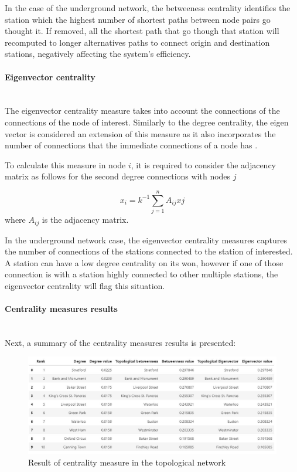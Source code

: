 \documentclass{article}
\begin{document}
In the case of the underground network, the betweeness centrality identifies the station which the highest number of shortest paths between node pairs go thought it. If removed, all the shortest path that go though that station will recomputed to longer alternatives paths to connect origin and destination stations, negatively affecting the system's efficiency.

\paragraph{Eigenvector centrality}\mbox{}\\

The eigenvector centrality measure takes into account the connections of the connections of the node of interest. Similarly to the degree centrality, the eigen vector is considered an extension of this measure as it also incorporates the number of connections that the immediate connections of a node has \citep{newmanNetworks2018}.


To calculate this measure in node $i$, it is required to consider the adjacency matrix as follows for the second degree connections with nodes $j$

\[x_{i}={k^{-1}}\sum_{j=1}^{n} {A_{ij}}{x{j}}\] where ${A_{ij}}$ is the adjacency matrix.

In the underground network case, the eigenvector centrality measures captures the number of connections of the stations connected to the station of interested. A station can have a low degree centrality on its won, however if one of those connection is with a station highly connected to other multiple stations, the eigenvector centrality will flag this situation.

\paragraph{Centrality measures results}\mbox{}\\

Next, a summary of the centrality measures results is presented:

\begin{figure}[htp]
    \centering
    \includegraphics[width=15cm]{Centrality_Results.jpg}
    \caption{Result of centrality measure in the topological network}
    \label{fig:centrality_results}
\end{figure}
\end{document}
